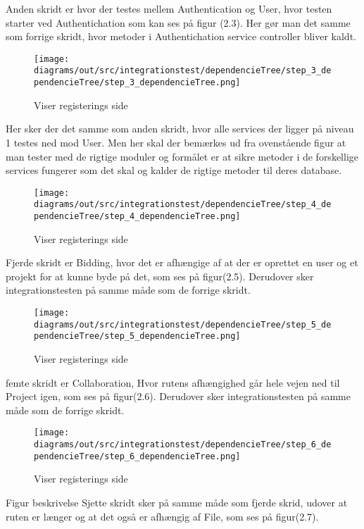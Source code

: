 Anden skridt er hvor der testes mellem Authentication og User, hvor testen starter ved Authentichation som kan ses på figur (2.3). Her gør man det samme som forrige skridt, hvor metoder i Authentichation service controller bliver kaldt.  

\newpage
\begin{figure}[ht]
    \centering
\texttt{[image: diagrams/out/src/integrationstest/dependencieTree/step\_3\_dependencieTree/step\_3\_dependencieTree.png]}
\caption{Viser registerings side}
\label{fig:figure2}
\end{figure}

Her sker der det samme som anden skridt, hvor alle services der ligger på niveau 1 testes ned mod User. Men her skal der bemærkes ud fra ovenstående figur at man tester med de rigtige moduler og formålet er at sikre metoder i de forskellige services fungerer som det skal og kalder de rigtige metoder til deres database.  


\begin{figure}[ht]
    \centering
\texttt{[image: diagrams/out/src/integrationstest/dependencieTree/step\_4\_dependencieTree/step\_4\_dependencieTree.png]}
\caption{Viser registerings side}
\label{fig:figure2}
\end{figure}

Fjerde skridt er Bidding, hvor det er afhængige af at der er oprettet en user og et projekt for at kunne byde på det, som ses på figur(2.5). Derudover sker integrationstesten på samme måde som de forrige skridt. 

\newpage
\begin{figure}[ht]
    \centering
\texttt{[image: diagrams/out/src/integrationstest/dependencieTree/step\_5\_dependencieTree/step\_5\_dependencieTree.png]}
\caption{Viser registerings side}
\label{fig:figure2}
\end{figure}

femte skridt er Collaboration, Hvor rutens afhængighed går hele vejen ned til Project igen, som ses på figur(2.6). Derudover sker integrationstesten på samme måde som de forrige skridt. 

\begin{figure}[ht]
    \centering
\texttt{[image: diagrams/out/src/integrationstest/dependencieTree/step\_6\_dependencieTree/step\_6\_dependencieTree.png]}
\caption{Viser registerings side}
\label{fig:figure2}
\end{figure}


Figur beskrivelse
Sjette skridt sker på samme måde som fjerde skrid, udover at ruten er længer og at det også er afhængig af File, som ses på figur(2.7). 


